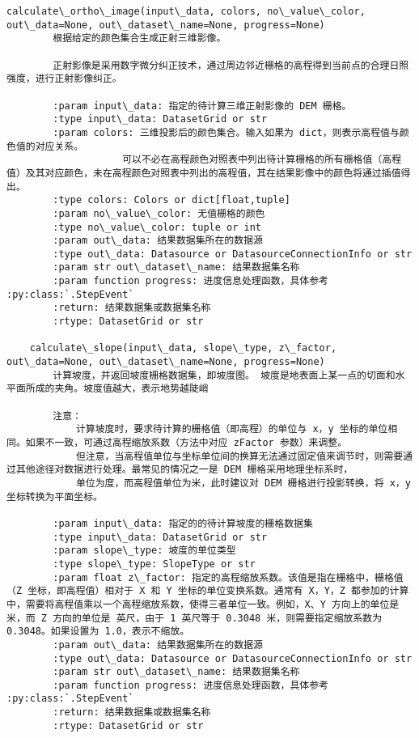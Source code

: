 \documentclass[11pt]{article}
\begin{document}
\begin{Verbatim}[commandchars=\\\{\}]
    calculate\_ortho\_image(input\_data, colors, no\_value\_color, out\_data=None, out\_dataset\_name=None, progress=None)
        根据给定的颜色集合生成正射三维影像。
        
        正射影像是采用数字微分纠正技术，通过周边邻近栅格的高程得到当前点的合理日照强度，进行正射影像纠正。
        
        :param input\_data: 指定的待计算三维正射影像的 DEM 栅格。
        :type input\_data: DatasetGrid or str
        :param colors: 三维投影后的颜色集合。输入如果为 dict，则表示高程值与颜色值的对应关系。
                    可以不必在高程颜色对照表中列出待计算栅格的所有栅格值（高程值）及其对应颜色，未在高程颜色对照表中列出的高程值，其在结果影像中的颜色将通过插值得出。
        :type colors: Colors or dict[float,tuple]
        :param no\_value\_color: 无值栅格的颜色
        :type no\_value\_color: tuple or int
        :param out\_data: 结果数据集所在的数据源
        :type out\_data: Datasource or DatasourceConnectionInfo or str
        :param str out\_dataset\_name: 结果数据集名称
        :param function progress: 进度信息处理函数，具体参考 :py:class:`.StepEvent`
        :return: 结果数据集或数据集名称
        :rtype: DatasetGrid or str
    
    calculate\_slope(input\_data, slope\_type, z\_factor, out\_data=None, out\_dataset\_name=None, progress=None)
        计算坡度，并返回坡度栅格数据集，即坡度图。 坡度是地表面上某一点的切面和水平面所成的夹角。坡度值越大，表示地势越陡峭
        
        注意：
            计算坡度时，要求待计算的栅格值（即高程）的单位与 x，y 坐标的单位相同。如果不一致，可通过高程缩放系数（方法中对应 zFactor 参数）来调整。
            但注意，当高程值单位与坐标单位间的换算无法通过固定值来调节时，则需要通过其他途径对数据进行处理。最常见的情况之一是 DEM 栅格采用地理坐标系时，
            单位为度，而高程值单位为米，此时建议对 DEM 栅格进行投影转换，将 x，y 坐标转换为平面坐标。
        
        :param input\_data: 指定的的待计算坡度的栅格数据集
        :type input\_data: DatasetGrid or str
        :param slope\_type: 坡度的单位类型
        :type slope\_type: SlopeType or str
        :param float z\_factor: 指定的高程缩放系数。该值是指在栅格中，栅格值（Z 坐标，即高程值）相对于 X 和 Y 坐标的单位变换系数。通常有 X，Y，Z 都参加的计算中，需要将高程值乘以一个高程缩放系数，使得三者单位一致。例如，X、Y 方向上的单位是米，而 Z 方向的单位是 英尺，由于 1 英尺等于 0.3048 米，则需要指定缩放系数为 0.3048。如果设置为 1.0，表示不缩放。
        :param out\_data: 结果数据集所在的数据源
        :type out\_data: Datasource or DatasourceConnectionInfo or str
        :param str out\_dataset\_name: 结果数据集名称
        :param function progress: 进度信息处理函数，具体参考 :py:class:`.StepEvent`
        :return: 结果数据集或数据集名称
        :rtype: DatasetGrid or str
    

\end{Verbatim}
\end{document}
